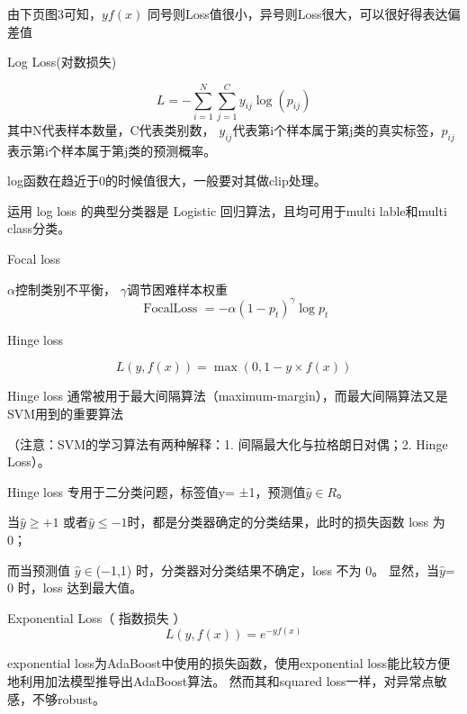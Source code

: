 \begin{outline}
 由下页图3可知，$yf(x)$ 同号则Loss值很小，异号则Loss很大，可以很好得表达偏差值



 \1 Log Loss(对数损失)

 \begin{equation}\label{loss:13}
	L=-\sum_{i=1}^{N} \sum_{j=1}^{C} y_{i j} \log \left(p_{i j}\right)
 \end{equation}
 其中N代表样本数量，C代表类别数， $ y_{i j}$代表第i个样本属于第j类的真实标签，$p_{i j}$表示第i个样本属于第j类的预测概率。
 
 log函数在趋近于0的时候值很大，一般要对其做clip处理。
 
 运用 log loss 的典型分类器是 Logistic 回归算法，且均可用于multi lable和multi class分类。
 
 \1 Focal loss

	$\alpha $控制类别不平衡， $\gamma $调节困难样本权重
 \begin{equation}\label{loss:14}
	\text { FocalLoss }=-\alpha\left(1-p_{t}\right)^{\gamma} \log p_{t}
 \end{equation}


\1 Hinge loss
 
 \begin{equation}\label{loss:15}
	L(y, f(x))=\max (0,1-y \times f(x))
 \end{equation}

 Hinge loss 通常被用于最大间隔算法（maximum-margin），而最大间隔算法又是SVM用到的重要算法
 
 （注意：SVM的学习算法有两种解释：1. 间隔最大化与拉格朗日对偶；2. Hinge Loss）。

	Hinge loss 专用于二分类问题，标签值y= ±1，预测值$\hat{y}\in R$。
	
	\2 当$\hat{y}\geq  +1$ 或者$\hat{y}\leq -1$时，都是分类器确定的分类结果，此时的损失函数 loss 为 0；
	
	\2 而当预测值 $\hat{y}\in$(−1,1) 时，分类器对分类结果不确定，loss 不为 0。
	显然，当$\hat{y}$= 0 时，loss 达到最大值。

\1 Exponential Loss（ 指数损失 ）
\begin{equation}\label{loss:16}
	L(y, f(x))=e^{-y f(x)}
 \end{equation}

 exponential loss为AdaBoost中使用的损失函数，使用exponential loss能比较方便地利用加法模型推导出AdaBoost算法。
 然而其和squared loss一样，对异常点敏感，不够robust。
\end{outline}













